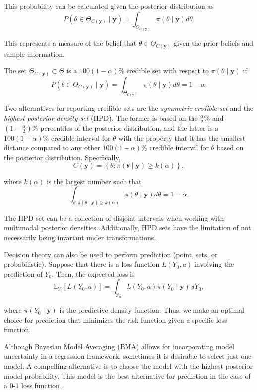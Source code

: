 This probability can be calculated given the posterior distribution as
\[
P(\theta \in \Theta_{C(\mathbf{y})} \mid \mathbf{y}) = \int_{\Theta_{C(\mathbf{y})}} \pi(\theta \mid \mathbf{y}) d\theta.
\]

This represents a measure of the belief that $\theta \in \Theta_{C(\mathbf{y})}$ given the prior beliefs and sample information.

The set $\Theta_{C(\mathbf{y})} \subset \Theta$ is a $100(1-\alpha)\%$ credible set with respect to $\pi(\theta \mid \mathbf{y})$ if
\[
P(\theta \in \Theta_{C(\mathbf{y})} \mid \mathbf{y}) = \int_{\Theta_{C(\mathbf{y})}} \pi(\theta \mid \mathbf{y}) d\theta = 1 - \alpha.
\]

Two alternatives for reporting credible sets are the \textit{symmetric credible set} and the \textit{highest posterior density set} (HPD). The former is based on the $\frac{\alpha}{2}\%$ and $(1 - \frac{\alpha}{2})\%$ percentiles of the posterior distribution, and the latter is a $100(1 - \alpha)\%$ credible interval for $\theta$ with the property that it has the smallest distance compared to any other $100(1 - \alpha)\%$ credible interval for $\theta$ based on the posterior distribution. Specifically,
\[
C(\mathbf{y}) = \left\{ \theta : \pi(\theta \mid \mathbf{y}) \geq k(\alpha) \right\},
\]

where $k(\alpha)$ is the largest number such that
\[
\int_{\theta : \pi(\theta \mid \mathbf{y}) \geq k(\alpha)} \pi(\theta \mid \mathbf{y}) d\theta = 1 - \alpha.
\]

The HPD set can be a collection of disjoint intervals when working with multimodal posterior densities. Additionally, HPD sets have the limitation of not necessarily being invariant under transformations.

Decision theory can also be used to perform prediction (point, sets, or probabilistic). Suppose that there is a loss function $L(Y_0, a)$ involving the prediction of $Y_0$. Then, the expected loss is
\[
\mathbb{E}_{Y_0}[L(Y_0, a)] = \int_{\mathcal{Y}_0} L(Y_0, a) \pi(Y_0 \mid \mathbf{y}) \, dY_0,
\]

where $\pi(Y_0 \mid \mathbf{y})$ is the predictive density function. Thus, we make an optimal choice for prediction that minimizes the risk function given a specific loss function.

Although Bayesian Model Averaging (BMA) allows for incorporating model uncertainty in a regression framework, sometimes it is desirable to select just one model. A compelling alternative is to choose the model with the highest posterior model probability. This model is the best alternative for prediction in the case of a 0-1 loss function \cite{Clyde2004}.

